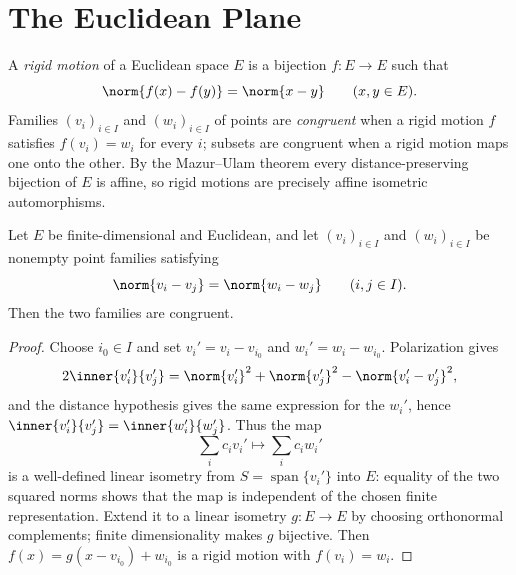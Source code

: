 
\section{The Euclidean Plane}

\begin{definition}
\label{def:rigid-motion}



A \emph{rigid motion} of a Euclidean space $E$ is a bijection $f\colon E\to E$ such that
\[
\norm{f(x)-f(y)}=\norm{x-y}\qquad (x,y\in E).
\]
Families $(v_i)_{i\in I}$ and $(w_i)_{i\in I}$ of points are \emph{congruent} when a rigid motion
$f$ satisfies $f(v_i)=w_i$ for every $i$; subsets are congruent when a rigid motion maps one onto
the other. By the Mazur--Ulam theorem every distance-preserving bijection of $E$ is affine, so rigid
motions are precisely affine isometric automorphisms.
\end{definition}

\begin{lemma}
\label{lem:isometry-extension}





Let $E$ be finite-dimensional and Euclidean, and let $(v_i)_{i\in I}$ and $(w_i)_{i\in I}$ be
nonempty point families satisfying
\[
\norm{v_i-v_j}=\norm{w_i-w_j}\qquad (i,j\in I).
\]
Then the two families are congruent.
\end{lemma}
\begin{proof}
\sketch Choose $i_0\in I$ and set $v_i'=v_i-v_{i_0}$ and $w_i'=w_i-w_{i_0}$. Polarization gives
\[
2\inner{v_i'}{v_j'}=\norm{v_i'}^2+\norm{v_j'}^2-\norm{v_i'-v_j'}^2,
\]
and the distance hypothesis gives the same expression for the $w_i'$, hence
$\inner{v_i'}{v_j'}=\inner{w_i'}{w_j'}$. Thus the map
\[
\sum_i c_i v_i'\longmapsto\sum_i c_i w_i'
\]
is a well-defined linear isometry from $S=\operatorname{span}\{v_i'\}$ into $E$: equality of the
two squared norms shows that the map is independent of the chosen finite representation. Extend it
to a linear isometry $g\colon E\to E$ by choosing orthonormal complements; finite dimensionality
makes $g$ bijective. Then $f(x)=g(x-v_{i_0})+w_{i_0}$ is a rigid motion with $f(v_i)=w_i$.
\end{proof}

